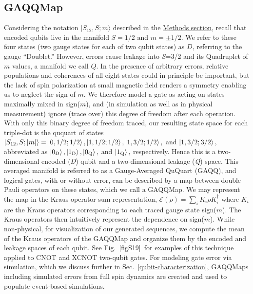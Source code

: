 \documentclass[aps,prl,twocolumn,superscriptaddress,nobibnotes,10pt,floatfix]{revtex4-2}
\newcommand{\secref}[1]{Sec.~\ref{#1}}
\newcommand{\figref}[1]{Fig.~\ref{#1}}
\begin{document}
\subsection{GAQQMap}\label{gaqqmap}

Considering the notation \(|S_{12},S;m\rangle\) described in the \hyperref[methods-section]{Methods section}, recall that encoded qubits live in the manifold $S=1/2$ and $m=\pm 1/2$.
We refer to these four states (two gauge states for each of two qubit states) as $D$, referring to the gauge ``Doublet.''
However, errors cause leakage into \emph{S}=3/2 and its Quadruplet of $m$ values, a manifold we call $Q$.
In the presence of arbitrary errors, relative populations and coherences of all eight states could in principle be important, but the lack of spin polarization at small magnetic field renders a symmetry enabling us to neglect the sign of $m$. We therefore model a gate as acting on states maximally mixed in sign($m$), and (in simulation as well as in physical measurement) ignore (trace over) this degree of freedom after each operation.
With only this binary degree of freedom traced, our resulting state space for each triple-dot is the ququart of states $\ket{S_{12},S;|m|}  = \ket{0,1/2;1/2}, \ket{1,1/2;1/2}, \ket{1,3/2;1/2},$ and $\ket{1,3/2;3/2},$ abbreviated as $\ket{0\textsubscript{D}}, \ket{1\textsubscript{D}}, \ket{0\textsubscript{Q}},$ and $\ket{1\textsubscript{Q}},$ respectively.
Hence this is a two-dimensional encoded (\emph{D}) qubit and a two-dimensional leakage (\emph{Q}) space.
This averaged manifold is referred to as a Gauge-Averaged QuQuart (GAQQ), and logical gates, with or without error, can be described by a map between double-Pauli operators on these states, which we call a GAQQMap.
We may represent the map in the Kraus operator-sum representation, \(\mathcal{E}(\rho) = \sum_{i}^{}{K_{i}\rho K_{i}^{\dagger}}\) where \(K_{i}\) are the Kraus operators corresponding to each traced gauge state sign($m$).
The Kraus operators then intuitively represent the dependence on sign($m$).
While non-physical, for visualization of our generated sequences, we compute the mean of the Kraus operators of the GAQQMap and organize them by the encoded and leakage spaces of each qubit.
See \figref{figS19}\ for examples of this technique applied to CNOT and XCNOT two-qubit gates.
For modeling gate error via simulation, which we discuss further in \secref{qubit-characterization}, GAQQMaps including simulated errors from full spin dynamics are created and used to populate event-based simulations.
\end{document}
